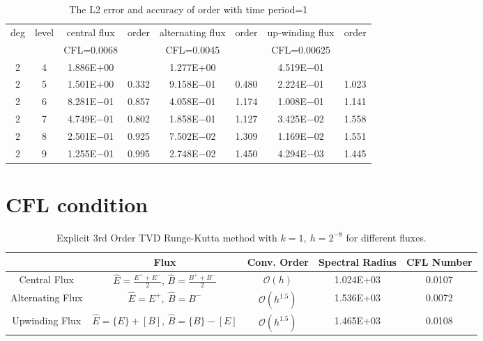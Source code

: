 \documentclass[a4paper]{article}
\begin{document}
\begin{table}[htbp]
\caption{\label{tab:test}The L2 error and accuracy of order with time period=1}
\centering
\vspace{5pt}
\begin{tabular}{cccccccc}
\toprule
deg &level &central flux &order &alternating flux &order &up-winding flux &order\\
       &        &CFL=0.0068 &         &CFL=0.0045       &         &CFL=0.00625         &         \\
\midrule
2 &4 &1.886E+00 &         &1.277E+00 &        &4.519E$-$01 &        \\
2 &5 &1.501E+00 &0.332&9.158E$-$01 &0.480&2.224E$-$01 &1.023\\
2 &6 &8.281E$-$01 &0.857&4.058E$-$01 &1.174&1.008E$-$01 &1.141\\
2 &7 &4.749E$-$01 &0.802&1.858E$-$01 &1.127&3.425E$-$02 &1.558\\
2 &8 &2.501E$-$01 &0.925&7.502E$-$02 &1.309&1.169E$-$02 &1.551\\
2 &9 &1.255E$-$01 &0.995&2.748E$-$02 &1.450&4.294E$-$03 &1.445\\    
\bottomrule
\end{tabular}


\end{table}


\section{CFL condition}


\begin{table}
\centering
\caption{Explicit 3rd Order TVD Runge-Kutta method with $k=1,\ h=2^{-8}$ for different fluxes.}
\begin{tabular}{c|c|ccc}
\toprule\hline
&Flux & Conv. Order  & Spectral Radius  &CFL Number\\ \hline \vspace{1pt}
Central Flux & $\hat{E}=\frac{E^++E^-}{2}$, $\hat{B}=\frac{B^++B^-}{2}$& $ \mathcal{O}(h)$ & 1.024E+03 &0.0107\\ \vspace{1pt}
Alternating Flux&$\hat{E}=E^+,\ \hat{B}=B^-$  & $\mathcal{O}(h^{1.5})$ &1.536E+03 &0.0072\\ \vspace{1pt}
Upwinding Flux &$\hat{E}=\{E\}+[B]$, $\hat{B}=\{B\}-[E]$  & $\mathcal{O}(h^{1.5})$ &1.465E+03 &0.0108\\ \hline\bottomrule
\end{tabular}
\end{table}
\end{document}
